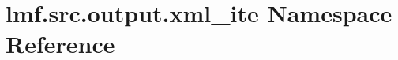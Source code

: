\hypertarget{namespacelmf_1_1src_1_1output_1_1xml__ite}{\section{lmf.\+src.\+output.\+xml\+\_\+ite Namespace Reference}
\label{namespacelmf_1_1src_1_1output_1_1xml__ite}
}
